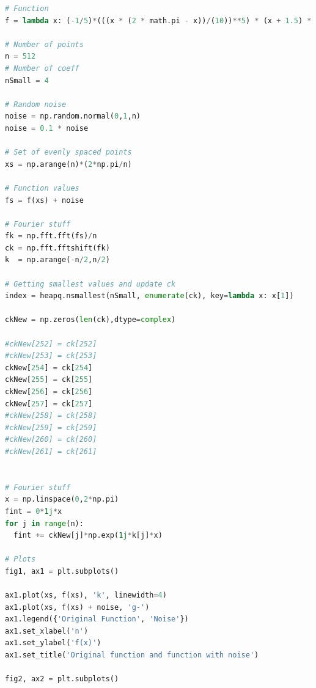 \documentclass[10pt]{exam}
\begin{document}
\begin{questions}
 \begin{lstlisting}[language = Python]
# Function
f = lambda x: (-1/5)*(((x * (2 * math.pi - x))/(10))**5) * (x + 1.5) * (x + 2.5) * (x - 4) + 1.7

# Number of points
n = 512
# Number of coeff
nSmall = 4

# Random noise
noise = np.random.normal(0,1,n)
noise = 0.1 * noise

# Set of evenly spaced points
xs = np.arange(n)*(2*np.pi/n)

# Function values
fs = f(xs) + noise

# Fourier stuff
fk = np.fft.fft(fs)/n
ck = np.fft.fftshift(fk)
k  = np.arange(-n/2,n/2)

# Getting smallest values and update ck
index = heapq.nsmallest(nSmall, enumerate(ck), key=lambda x: x[1])

ckNew = np.zeros(len(ck),dtype=complex)

#ckNew[252] = ck[252]
#ckNew[253] = ck[253]
ckNew[254] = ck[254]
ckNew[255] = ck[255]
ckNew[256] = ck[256]
ckNew[257] = ck[257]
#ckNew[258] = ck[258]
#ckNew[259] = ck[259]
#ckNew[260] = ck[260]
#ckNew[261] = ck[261]


# Fourier stuff
x = np.linspace(0,2*np.pi)
fint = 0*1j*x 
for j in range(n):
  fint += ckNew[j]*np.exp(1j*k[j]*x)

# Plots
fig1, ax1 = plt.subplots()  
  
ax1.plot(xs, f(xs), 'k', linewidth=4)
ax1.plot(xs, f(xs) + noise, 'g-')
ax1.legend({'Original Function', 'Noise'})
ax1.set_xlabel('n')
ax1.set_ylabel('f(x)')
ax1.set_title('Original function and function with noise')

fig2, ax2 = plt.subplots()


\end{lstlisting}
\end{questions}
\end{document}
